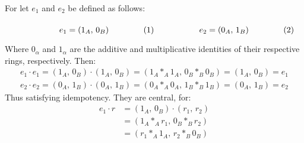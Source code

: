 \documentclass[crop=false,class=article]{standalone}                       %
\begin{document}
        \begin{solution}
            For let $e_{1}$ and $e_{2}$ be defined as follows:
            \par\hfill\par
            \begin{subequations}
                \begin{minipage}[b]{0.49\textwidth}
                    \begin{equation}
                        e_{1}=(1_{A},\,0_{B})
                    \end{equation}
                \end{minipage}
                \hfill
                \begin{minipage}[b]{0.49\textwidth}
                    \begin{equation}
                        e_{2}=(0_{A},\,1_{B})
                    \end{equation}
                \end{minipage}
            \end{subequations}
            \par\vspace{2.5ex}
            Where $0_{\alpha}$ and $1_{\alpha}$ are the additive and
            multiplicative identities of their respective rings,
            respectively. Then:
            \begin{subequations}
                \begin{align}
                    e_{1}\cdot{e}_{1}
                    =(1_{A},\,0_{B})\cdot(1_{A},\,0_{B})
                    =(1_{A}*_{A}1_{A},\,0_{B}*_{B}0_{B})
                    =(1_{A},\,0_{B})
                    =e_{1}\\
                    e_{2}\cdot{e}_{2}
                    =(0_{A},\,1_{B})\cdot(0_{A},\,1_{B})
                    =(0_{A}*_{A}0_{A},\,1_{B}*_{B}1_{B})
                    =(0_{A},\,1_{B})
                    =e_{2}
                \end{align}
            \end{subequations}
            Thus satisfying idempotency. They are central, for:
            \begin{subequations}
                \begin{align}
                    e_{1}\cdot{r}
                    &=(1_{A},\,0_{B})\cdot(r_{1},\,r_{2})\\
                    &=(1_{A}*_{A}r_{1},\,0_{B}*_{B}r_{2})\\
                    &=(r_{1}*_{A}1_{A},\,r_{2}*_{B}0_{B})\\

\end{align}
\end{subequations}
\end{solution}
\end{document}
